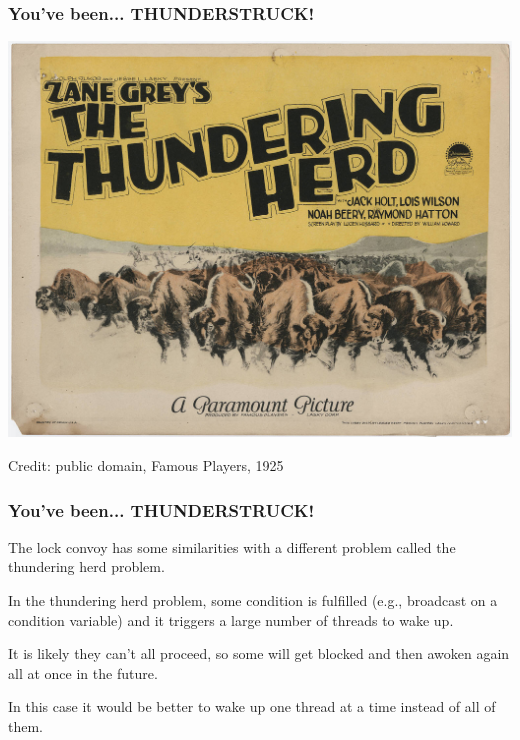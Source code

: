 \begin{frame}
\frametitle{You've been... THUNDERSTRUCK!}

\begin{center}
\includegraphics[width=.8\textwidth]{images/L08-thundering-herd.jpg}

Credit: public domain, Famous Players, 1925
\end{center}

\end{frame}


\begin{frame}
\frametitle{You've been... THUNDERSTRUCK!}

The lock convoy has some similarities with a different problem called the \alert{thundering herd problem}. 

In the thundering herd problem, some condition is fulfilled (e.g., broadcast on a condition variable) and it triggers a large number of threads to wake up. 

It is likely they can't all proceed, so some will get blocked and then awoken again all at once in the future. 

In this case it would be better to wake up one thread at a time instead of all of them.

\end{frame}

